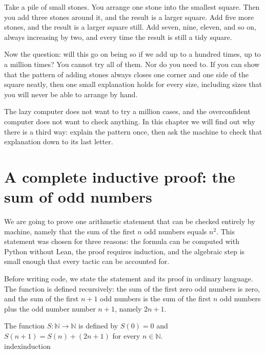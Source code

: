 \begin{untukanak}
Take a pile of small stones. You arrange one stone into the smallest square. Then you add three
stones around it, and the result is a larger square. Add five more stones, and the result is a
larger square still. Add seven, nine, eleven, and so on, always increasing by two, and every time
the result is still a tidy square.

Now the question: will this go on being so if we add up to a hundred times, up to a million times?
You cannot try all of them. Nor do you need to. If you can show that the pattern of adding stones
always closes one corner and one side of the square neatly, then one small explanation holds for
every size, including sizes that you will never be able to arrange by hand.

The lazy computer does not want to try a million cases, and the overconfident computer does not want
to check anything. In this chapter we will find out why there is a third way: explain the pattern
once, then ask the machine to check that explanation down to its last letter.
\end{untukanak}

\section{A complete inductive proof: the sum of odd numbers}


We are going to prove one arithmetic statement that can be checked entirely by machine, namely that
the sum of the first $n$ odd numbers equals $n^{2}$. This statement was chosen for three reasons:
the formula can be computed with Python without Lean, the proof requires induction, and the
algebraic step is small enough that every tactic can be accounted for.


Before writing code, we state the statement and its proof in ordinary language. The function is
defined recursively: the sum of the first zero odd numbers is zero, and the sum of the first $n+1$
odd numbers is the sum of the first $n$ odd numbers plus the odd number number $n+1$, namely
$2n+1$.

\begin{definisi}
The function $S:\mathbb{N}\to\mathbb{N}$ is defined by $S(0)=0$ and $S(n+1)=S(n)+(2n+1)$ for every
$n\in\mathbb{N}$.\\index{induction}
\end{definisi}

